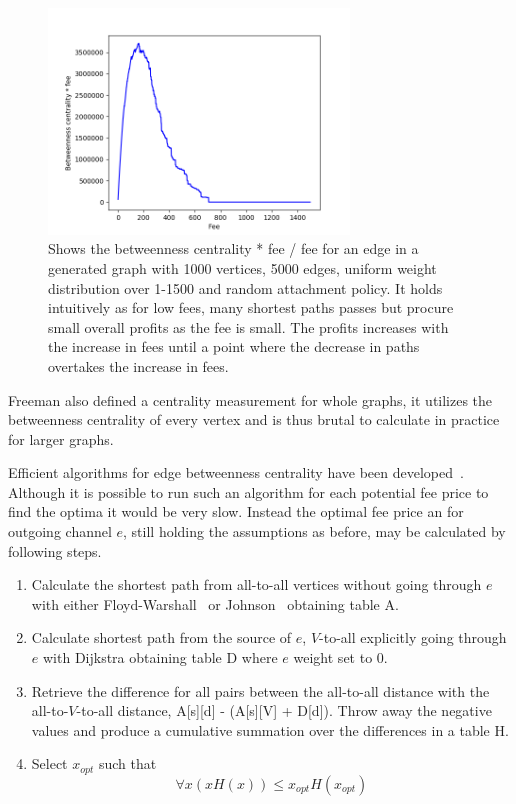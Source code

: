 \begin{figure}[!htb]

	\centering
	\includegraphics[width=8cm]{images/fee_curve.png}
	\caption{ Shows the betweenness centrality * fee / fee for an edge in a generated graph with 1000 vertices, 5000 edges, uniform weight distribution over 1-1500 and random attachment policy. It holds intuitively as for low fees, many shortest paths passes but procure small overall profits as the fee is small. The profits increases with the increase in fees until a point where the decrease in paths overtakes the increase in fees.
	}
	\label{fig:fee_curve}

\end{figure}

Freeman also defined a centrality measurement for whole graphs, it utilizes the betweenness centrality of every vertex and is thus brutal to calculate in practice for larger graphs. 

Efficient algorithms for edge betweenness centrality have been developed~\cite{brandes:betweenness:centrality:algorithm}. Although it is possible to run such an algorithm for each potential fee price to find the optima it would be very slow.
Instead the optimal fee price an for outgoing channel $e$, still holding the assumptions as before, may be calculated by following steps.

\begin{enumerate}
	\item Calculate the shortest path from all-to-all vertices without going through $e$ with either Floyd-Warshall~\cite{bakhtiar:floyd:warshall} or Johnson~\cite{johnson:shortest:path:sparse:network} obtaining table A.
	\item Calculate shortest path from the source of $e$, $V$-to-all explicitly going through $e$ with Dijkstra obtaining table D where $e$ weight set to 0.
	\item Retrieve the difference for all pairs between the all-to-all distance with the all-to-$V$-to-all distance, A[s][d] - (A[s][V] + D[d]). Throw away the negative values and produce a cumulative summation over the differences in a table H.
	\item Select $x_{opt}$ such that \[ \forall x (x H(x)) \leq x_{opt} H(x_{opt}) \]

\end{enumerate} 


